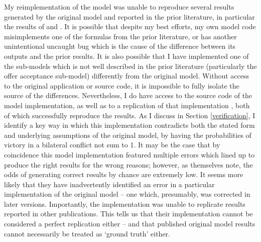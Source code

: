 My reimplementation of the model was unable to reproduce several results generated by the original model and reported in the prior literature, in particular the results of \citet{bdm_1994} and \citet[chapter 6]{bdm_2002}. It is possible that despite my best efforts, my own model code misimplements one of the formulas from the prior literature, or has another unintentional uncaught bug which is the cause of the difference between its outputs and the prior results. It is also possible that I have implemented one of the sub-models which is not well described in the prior literature (particularly the offer acceptance sub-model) differently from the original model. Without access to the original application or source code, it is impossible to fully isolate the source of the differences. Nevertheless, I do have access to the source code of the \citet{scholz_2011} model implementation, as well as to a replication of that implementation \citep{mckibben_sanders_2014}, both of which successfully reproduce the \citet{bdm_1994} results. As I discuss in Section \ref{verification}, I identify a key way in which this implementation contradicts both the stated form and underlying assumptions of the original model, by having the probabilities of victory in a bilateral conflict not sum to 1. It may be the case that by coincidence this model implementation featured multiple errors which lined up to produce the right results for the wrong reasons; however, as \citet{scholz_2011} themselves note, the odds of generating correct results by chance are extremely low. It seems more likely that they have inadvertently identified an error in a particular implementation of the original model -- one which, presumably, was corrected in later versions. Importantly, the \citet{scholz_2011} implementation was unable to replicate results reported in other publications. This tells us that their implementation cannot be considered a perfect replication either -- and that published original model results cannot necessarily be treated as `ground truth' either.

